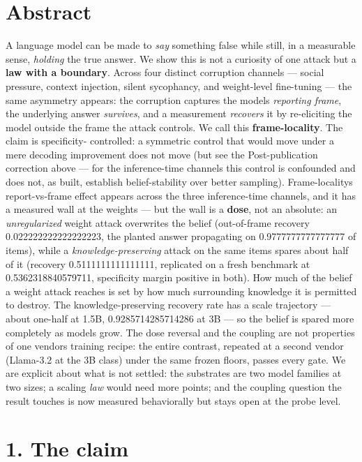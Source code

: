 \documentclass[11pt]{article}
\begin{document}
\section{Abstract}\label{abstract}

A language model can be made to \emph{say} something false while still, in a measurable sense, \emph{holding} the true answer. We show this is not a curiosity of one attack but a \textbf{law with a boundary}. Across four distinct corruption channels --- social pressure, context injection, silent sycophancy, and weight-level fine-tuning --- the same asymmetry appears: the corruption captures the model\textquotesingle s \emph{reporting frame}, the underlying answer \emph{survives}, and a measurement \emph{recovers} it by re-eliciting the model outside the frame the attack controls. We call this \textbf{frame-locality}. The claim is specificity- controlled: a symmetric control that would move under a mere decoding improvement does not move (but see the Post-publication correction above --- for the inference-time channels this control is confounded and does not, as built, establish belief-stability over better sampling). Frame-locality\textquotesingle s report-vs-frame effect appears across the three inference-time channels, and it has a measured wall at the weights --- but the wall is a \textbf{dose}, not an absolute: an \emph{unregularized} weight attack overwrites the belief (out-of-frame recovery 0.022222222222222223, the planted answer propagating on 0.9777777777777777 of items), while a \emph{knowledge-preserving} attack on the same items spares about half of it (recovery 0.5111111111111111, replicated on a fresh benchmark at 0.5362318840579711, specificity margin positive in both). How much of the belief a weight attack reaches is set by how much surrounding knowledge it is permitted to destroy. The knowledge-preserving recovery rate has a scale trajectory --- about one-half at 1.5B, 0.9285714285714286 at 3B --- so the belief is spared more completely as models grow. The dose reversal and the coupling are not properties of one vendor\textquotesingle s training recipe: the entire contrast, repeated at a second vendor (Llama-3.2 at the 3B class) under the same frozen floors, passes every gate. We are explicit about what is not settled: the substrates are two model families at two sizes; a scaling \emph{law} would need more points; and the coupling question the result touches is now measured behaviorally but stays open at the probe level.

\section{1. The claim}\label{1-the-claim}
\end{document}
